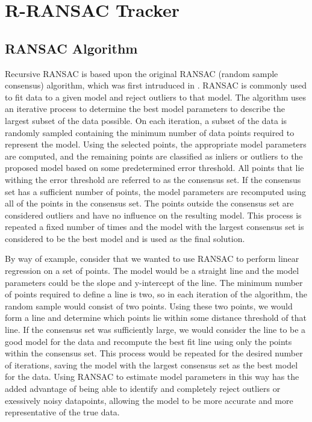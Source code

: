 \section{R-RANSAC Tracker}
\subsection{RANSAC Algorithm}
Recursive RANSAC is based upon the original RANSAC (random sample consensus) algorithm, which was first intruduced in \cite{FischlerBolles81}. 
RANSAC is commonly used to fit data to a given model and reject outliers to that model. 
The algorithm uses an iterative process to determine the best model parameters to describe the largest subset of the data possible. 
On each iteration, a subset of the data is randomly sampled containing the minimum number of data points required to represent the model. 
Using the selected points, the appropriate model parameters are computed, and the remaining points are classified as inliers or outliers to the proposed model based on some predetermined error threshold. All points that lie withing the error threshold are referred to as the consensus set. 
If the consensus set has a sufficient number of points, the model parameters are recomputed using all of the points in the consensus set. 
The points outside the consensus set are considered outliers and have no influence on the resulting model. This process is repeated a fixed number of times and the model with the largest consensus set is considered to be the best model and is used as the final solution. 

By way of example, consider that we wanted to use RANSAC to perform linear regression on a set of points. The model would be a straight line and the model parameters could be the slope and y-intercept of the line. The minimum number of points required to define a line is two, so in each iteration of the algorithm, the random sample would consist of two points. Using these two points, we would form a line and determine which points lie within some distance threshold of that line. If the consensus set was sufficiently large, we would consider the line to be a good model for the data and recompute the best fit line using only the points within the consensus set. This process would be repeated for the desired number of iterations, saving the model with the largest consensus set as the best model for the data. Using RANSAC to estimate model parameters in this way has the added advantage of being able to identify and completely reject outliers or exessively noisy datapoints, allowing the model to be more accurate and more representative of the true data.

